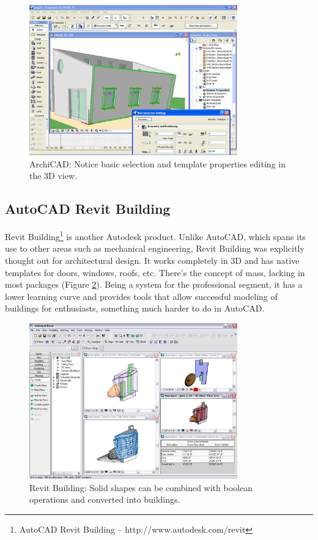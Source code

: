 \begin{figure}[!ht]
    \centering
    \includegraphics[width=9cm]{gfx/archicad-1.png}
    \caption{ArchiCAD: Notice basic selection and template properties editing in the 3D view.}
    \label{FIG-ARCHICAD}
\end{figure}

\subsection{AutoCAD Revit Building}
\nocite{SITE-REVIT}
Revit Building\footnote{AutoCAD Revit Building -- http://www.autodesk.com/revit}
is another Autodesk product.
Unlike AutoCAD, which spans its use to other areas such as mechanical engineering,
Revit Building was explicitly thought out for architectural design.
It works completely in 3D and has native templates for doors,
windows, roofs, etc. There's the concept of mass, lacking in most packages (Figure \ref{FIG-REVIT}).
Being a system for the professional segment, it has a lower learning curve and provides
tools that allow successful modeling of buildings for enthusiasts, something much harder
to do in AutoCAD.

\begin{figure}[!ht]
    \centering
    \includegraphics[width=9cm]{gfx/revit-1.png}
    \caption{Revit Building: Solid shapes can be combined with boolean operations and converted into buildings.}
    \label{FIG-REVIT}
\end{figure}

